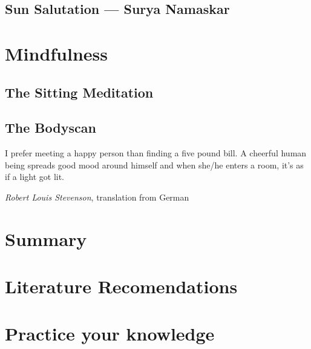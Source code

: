 \documentclass[../main.tex]{subfiles}
\begin{document}
\newpage
\section{Sun Salutation ---  Surya Namaskar}

\chapter{Mindfulness}
\section{The Sitting Meditation} %


\section{The Bodyscan}




\newpage

\epigraph{I prefer meeting a happy person than finding a five pound bill. A cheerful human being spreads good mood around himself and when she/he enters a room, it's as if a light got lit.}{\textit{Robert Louis Stevenson}, translation from German}



\chapter{Summary}

\chapter{Literature Recomendations}


\chapter{Practice your knowledge}

\end{document}
